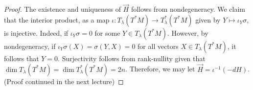 \documentclass{article}
\begin{document}
\begin{proof}
    The existence and uniqueness of $\vec H$ follows from nondegeneracy. We claim that the interior product, as a map $\iota:T_\lambda(T^*M)\to T_\lambda^*(T^*M)$ given by $Y\mapsto \iota_Y\sigma$, is injective. Indeed, if $\iota_Y\sigma = 0$ for some $Y\in T_\lambda(T^*M)$. However, by nondegeneracy, if $\iota_Y\sigma(X) = \sigma(Y,X) = 0$ for all vectors $X\in T_\lambda(T^*M)$, it follows that $Y=0$. Surjectivity follows from rank-nullity given that $\dim T_\lambda(T^*M) = \dim T^*_\lambda(T^*M) = 2n$. Therefore, we may let $\vec H = \iota^{-1}(-dH)$. (Proof continued in the next lecture)
\end{proof}
\end{document}
